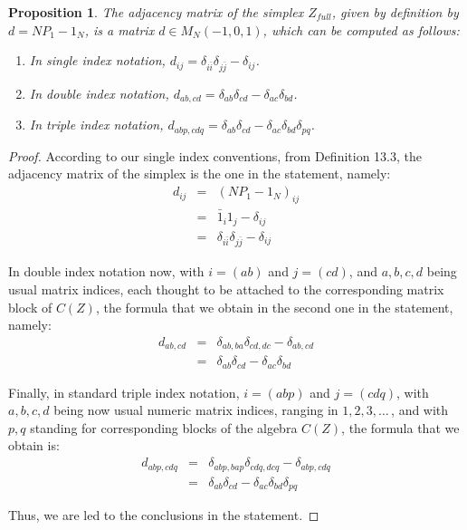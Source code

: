 \documentclass[12pt]{amsbook}
\newtheorem{proposition}[theorem]{Proposition}
\begin{document}
\begin{proposition}
The adjacency matrix of the simplex $Z_{full}$, given by definition by $d=NP_1-1_N$, is a matrix $d\in M_N(-1,0,1)$, which can be computed as follows:
\begin{enumerate}
\item In single index notation, $d_{ij}=\delta_{i\bar{i}}\delta_{j\bar{j}}-\delta_{ij}$.

\item In double index notation, $d_{ab,cd}=\delta_{ab}\delta_{cd}-\delta_{ac}\delta_{bd}$.

\item In triple index notation, $d_{abp,cdq}=\delta_{ab}\delta_{cd}-\delta_{ac}\delta_{bd}\delta_{pq}$.
\end{enumerate}
\end{proposition}

\begin{proof}
According to our single index conventions, from Definition 13.3, the adjacency matrix of the simplex is the one in the statement, namely:
\begin{eqnarray*}
d_{ij}
&=&(NP_1-1_N)_{ij}\\
&=&\bar{1}_i1_j-\delta_{ij}\\
&=&\delta_{i\bar{i}}\delta_{j\bar{j}}-\delta_{ij}
\end{eqnarray*}

In double index notation now, with $i=(ab)$ and $j=(cd)$, and $a,b,c,d$ being usual matrix indices, each thought to be attached to the corresponding matrix block of $C(Z)$, the formula that we obtain in the second one in the statement, namely:
\begin{eqnarray*}
d_{ab,cd}
&=&\delta_{ab,ba}\delta_{cd,dc}-\delta_{ab,cd}\\
&=&\delta_{ab}\delta_{cd}-\delta_{ac}\delta_{bd}
\end{eqnarray*}

Finally, in standard triple index notation, $i=(abp)$ and $j=(cdq)$, with $a,b,c,d$ being now usual numeric matrix indices, ranging in $1,2,3,\ldots\,$, and with $p,q$ standing for corresponding blocks of the algebra $C(Z)$, the formula that we obtain is:
\begin{eqnarray*}
d_{abp,cdq}
&=&\delta_{abp,bap}\delta_{cdq,dcq}-\delta_{abp,cdq}\\
&=&\delta_{ab}\delta_{cd}-\delta_{ac}\delta_{bd}\delta_{pq}
\end{eqnarray*}

Thus, we are led to the conclusions in the statement.
\end{proof}
\end{document}
